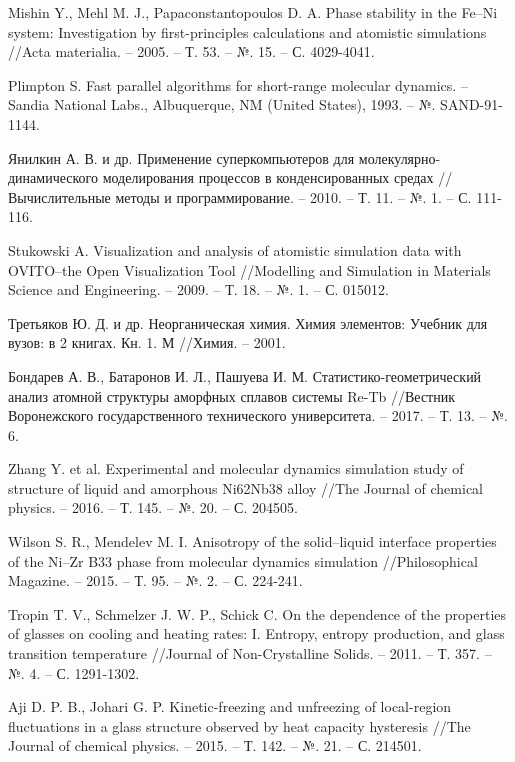\documentclass[master,14pt,subf,href,colorlinks=true]{disser}
\begin{document}
\begin{thebibliography}{44}
	Mishin Y., Mehl M. J., Papaconstantopoulos D. A. Phase stability in the Fe–Ni system: Investigation by first-principles calculations and atomistic simulations //Acta materialia. – 2005. – Т. 53. – №. 15. – С. 4029-4041.
	
	Plimpton S. Fast parallel algorithms for short-range molecular dynamics. – Sandia National Labs., Albuquerque, NM (United States), 1993. – №. SAND-91-1144.
	
	Янилкин А. В. и др. Применение суперкомпьютеров для молекулярно-динамического моделирования процессов в конденсированных средах //Вычислительные методы и программирование. – 2010. – Т. 11. – №. 1. – С. 111-116.
	

	

	
	Stukowski A. Visualization and analysis of atomistic simulation data with OVITO–the Open Visualization Tool //Modelling and Simulation in Materials Science and Engineering. – 2009. – Т. 18. – №. 1. – С. 015012.
	
	Третьяков Ю. Д. и др. Неорганическая химия. Химия элементов: Учебник для вузов: в 2 книгах. Кн. 1. М //Химия. – 2001.
	
	Бондарев А. В., Батаронов И. Л., Пашуева И. М. Статистико-геометрический анализ атомной структуры аморфных сплавов системы Re-Tb //Вестник Воронежского государственного технического университета. – 2017. – Т. 13. – №. 6.
	
	Zhang Y. et al. Experimental and molecular dynamics simulation study of structure of liquid and amorphous Ni62Nb38 alloy //The Journal of chemical physics. – 2016. – Т. 145. – №. 20. – С. 204505.
	
	Wilson S. R., Mendelev M. I. Anisotropy of the solid–liquid interface properties of the Ni–Zr B33 phase from molecular dynamics simulation //Philosophical Magazine. – 2015. – Т. 95. – №. 2. – С. 224-241.
	

	
	

	
	Tropin T. V., Schmelzer J. W. P., Schick C. On the dependence of the properties of glasses on cooling and heating rates: I. Entropy, entropy production, and glass transition temperature //Journal of Non-Crystalline Solids. – 2011. – Т. 357. – №. 4. – С. 1291-1302.
	
	Aji D. P. B., Johari G. P. Kinetic-freezing and unfreezing of local-region fluctuations in a glass structure observed by heat capacity hysteresis //The Journal of chemical physics. – 2015. – Т. 142. – №. 21. – С. 214501.
	

	

	

	

	

	
\end{thebibliography}
%
%
\end{document}
